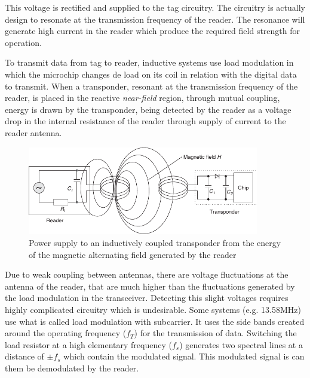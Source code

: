 This voltage is rectified and supplied to the tag circuitry.
The circuitry is actually design to resonate at the transmission frequency of the reader. The resonance will generate high current in the reader which produce the required field strength for operation.

To transmit data from tag to reader, inductive systems use load modulation in which the microchip changes de load on its coil in relation with the digital data to transmit. When a transponder, resonant at the transmission frequency of the reader, is placed in the reactive \emph{near-field} region, through mutual coupling, energy is drawn by the transponder, being detected by the reader as a voltage drop in the internal resistance of the reader through supply of current to the reader antenna.

\begin{figure}[!ht]
    \centering
    \includegraphics[width=0.9\textwidth]{./figs/02-state-of-the-art/loadmodulation.pdf}
    \caption{Power supply to an inductively coupled transponder from the energy of the magnetic alternating field generated by the reader~\cite{finkenzellerRFIDHandbookFundamentals2003}} 
    \label{fig:loadmodulation}
\end{figure}

Due to weak coupling between antennas, there are voltage fluctuations at the antenna of the reader, that are much higher than the fluctuations generated by the load modulation in the transceiver. Detecting this slight voltages requires highly complicated circuitry which is undesirable.
Some systems (e.g. 13.58MHz) use what is called load modulation with subcarrier. It uses the side bands created around the operating frequency ($f_T$) for the transmission of data. Switching the load resistor at a high elementary frequency ($f_s$) generates two spectral lines at a distance of $\pm f_s$ which contain the modulated signal. This modulated signal is can them be demodulated by the reader.

